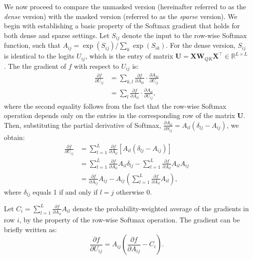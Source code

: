 \documentclass[lettersize,onecolumn]{IEEEtran}
\begin{document}
We now proceed to compare the unmasked version (hereinafter referred to as the \emph{dense} version) with the masked version (referred to as the \emph{sparse} version). 
We begin with establishing a basic property of the Softmax gradient that holds for both dense and sparse settings. Let $S_{ij}$ denote the input to the row-wise Softmax function, such that $A_{i j}=\exp \left(S_{i j}\right) / \sum_{k} \exp \left(S_{i k}\right)$. For the dense version, $S_{ij}$ is identical to the logits $U_{ij}$, which is the entry of matrix $\mathbf{U}=\mathbf{X}\mathbf{W}_{QK}\mathbf{X}^{\top}\in  \mathbb{R}^{L\times L}$. The the gradient of $f$ with respect to $U_{ij}$ is:
\begin{equation}
    \begin{aligned}
    \frac{\partial f}{\partial U_{i j}}&=\sum_{k, l} \frac{\partial f}{\partial A_{k l}} \cdot \frac{\partial A_{k l}}{\partial U_{i j}}\\
    &=\sum_{l} \frac{\partial f}{\partial A_{i l}} \cdot \frac{\partial A_{il}}{\partial U_{i j}},
    \end{aligned}
\end{equation}
where the second equality follows from the fact that the row-wise Softmax operation depends only on the entries in the corresponding row of the matrix $\mathbf{U}$. Then, substituting the partial derivative of Softmax, $\frac{\partial A_{i l}}{\partial S_{i j}}=A_{i l}\left(\delta_{l j}-A_{i j}\right)$, we obtain:
\begin{equation}
    \begin{aligned}
\frac{\partial f}{\partial U_{i j}} & =\sum_{l=1}^{L} \frac{\partial f}{\partial A_{i l}}\left[A_{i l}\left(\delta_{l j}-A_{i j}\right)\right] \\
& =\sum_{l=1}^{L} \frac{\partial f}{\partial A_{i l}} A_{i l} \delta_{l j}-\sum_{l=1}^{L} \frac{\partial f}{\partial A_{i l}} A_{i l} A_{i j} \\
& =\frac{\partial f}{\partial A_{i j}} A_{i j}-A_{i j}\left(\sum_{l=1}^{L} \frac{\partial f}{\partial A_{i l}} A_{i l}\right),
\end{aligned}
\end{equation}
where $\delta_{lj}$ equals 1 if and only if $l=j$ otherwise 0.

Let $C_i = \sum_{l=1}^{L} \frac{\partial f}{\partial A_{i l}} A_{i l}$ denote the probability-weighted average of the gradients in row $i$, by the property of the row-wise Softmax operation. The gradient can be briefly written as:
\begin{equation}
    \frac{\partial f}{\partial U_{i j}} = A_{ij} \left( \frac{\partial f}{\partial A_{ij}} - C_i\right).
\end{equation}
\end{document}
